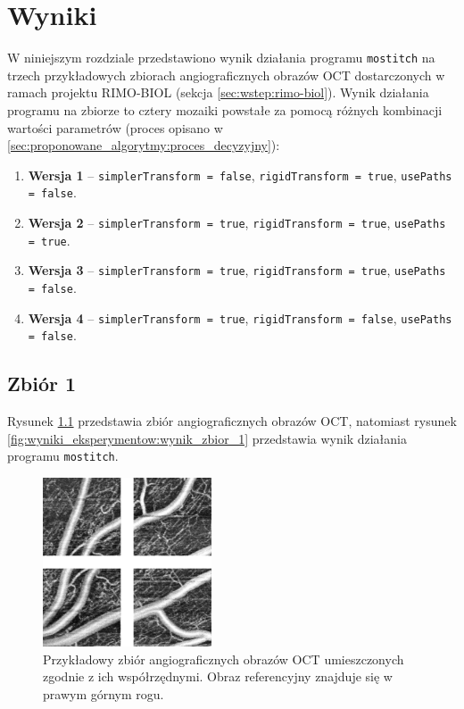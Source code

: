 %
\chapter{Wyniki}
\label{sec:wyniki_eksperymentow}

W niniejszym rozdziale przedstawiono wynik działania programu \texttt{mostitch} na trzech przykładowych zbiorach angiograficznych obrazów OCT dostarczonych w ramach projektu RIMO-BIOL (sekcja \ref{sec:wstep:rimo-biol}). Wynik działania programu na zbiorze to cztery mozaiki powstałe za pomocą różnych kombinacji wartości parametrów (proces opisano w \ref{sec:proponowane_algorytmy:proces_decyzyjny}):

\begin{enumerate}
\item \textbf{Wersja 1} -- \texttt{simplerTransform = false}, \texttt{rigidTransform = true}, \texttt{usePaths = false}. 
\item \textbf{Wersja 2} -- \texttt{simplerTransform = true}, \texttt{rigidTransform = true}, \texttt{usePaths = true}.
\item \textbf{Wersja 3} -- \texttt{simplerTransform = true}, \texttt{rigidTransform = true}, \texttt{usePaths = false}.
\item \textbf{Wersja 4} -- \texttt{simplerTransform = true}, \texttt{rigidTransform = false}, \texttt{usePaths = false}.
\end{enumerate}

\section{Zbiór 1}
\label{sec:zbior_1}

Rysunek \ref{fig:wyniki_eksperymentow:zbior_1} przedstawia zbiór angiograficznych obrazów OCT, natomiast rysunek \ref{fig:wyniki_eksperymentow:wynik_zbior_1} przedstawia wynik działania programu \texttt{mostitch}.

\begin{figure}[H]
  \centering
  \includegraphics[width=5cm]{gfx/zbior_1}
  \caption{Przykładowy zbiór angiograficznych obrazów OCT umieszczonych zgodnie z ich współrzędnymi. Obraz referencyjny znajduje się w prawym górnym rogu.}
  \label{fig:wyniki_eksperymentow:zbior_1}
\end{figure}

